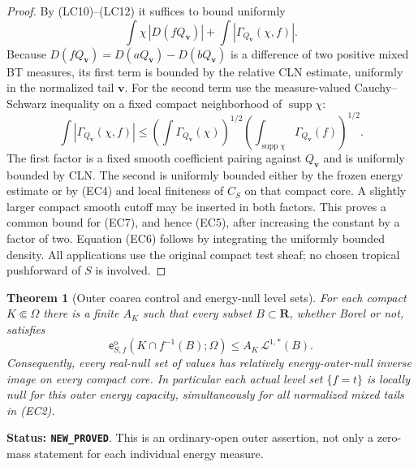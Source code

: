 \documentclass[11pt,a4paper]{article}
\numberwithin{equation}{section}
\newtheorem{theorem}{Theorem}[section]
\theoremstyle{definition}
\theoremstyle{remark}
\begin{document}
\begin{proof}
By (LC10)--(LC12) it suffices to bound uniformly
\[
 \int\chi\,|D(fQ_{\mathbf v})|
                  +\int|\Gamma_{Q_{\mathbf v}}(\chi,f)|.
 \tag{EC7}
\]
Because $D(fQ_{\mathbf v})=D(aQ_{\mathbf v})-D(bQ_{\mathbf v})$
is a difference of two positive mixed BT measures, its first
term is bounded by the relative CLN estimate, uniformly in the
normalized tail $\mathbf v$.  For the second term use the
measure-valued Cauchy--Schwarz inequality on a fixed compact
neighborhood of $\operatorname{supp}\chi$:
\[
 \int|\Gamma_{Q_{\mathbf v}}(\chi,f)|
 \le
 \left(\int\Gamma_{Q_{\mathbf v}}(\chi)\right)^{1/2}
 \left(\int_{\operatorname{supp}\chi}
                                 \Gamma_{Q_{\mathbf v}}(f)\right)^{1/2}.
\]
The first factor is a fixed smooth coefficient pairing against
$Q_{\mathbf v}$ and is uniformly bounded by CLN.  The second
is uniformly bounded either by the frozen energy estimate or
by (EC4) and local finiteness of $C_S$ on that compact core.
A slightly larger compact smooth cutoff may be inserted in
both factors.  This proves a common bound for (EC7), and hence
(EC5), after increasing the constant by a factor of two.
Equation (EC6) follows by integrating the uniformly bounded
density.  All applications use the original compact test
sheaf; no chosen tropical pushforward of $S$ is involved.
\end{proof}

\begin{theorem}[Outer coarea control and energy-null level sets]
\label{thm:r11-outer-coarea-capacity}
For each compact $K\Subset\Omega$ there is a finite $A_K$
such that every subset $B\subset\mathbf R$, whether Borel or
not, satisfies
\[
 \boxed{\quad
 \mathsf e_{S,f}^{\mathrm o}
                  (K\cap f^{-1}(B);\Omega)
                 \le A_K\,\mathcal L^{1,*}(B).
 \quad}
 \tag{EC8}
\]
Consequently, every real-null set of values has relatively
energy-outer-null inverse image on every compact core.  In
particular each actual level set $\{f=t\}$ is locally null
for this outer energy capacity, simultaneously for all
normalized mixed tails in (EC2).
\end{theorem}

\noindent\textbf{Status: \texttt{NEW\_PROVED}}.  This is an
ordinary-open outer assertion, not only a zero-mass statement
for each individual energy measure.
\end{document}
